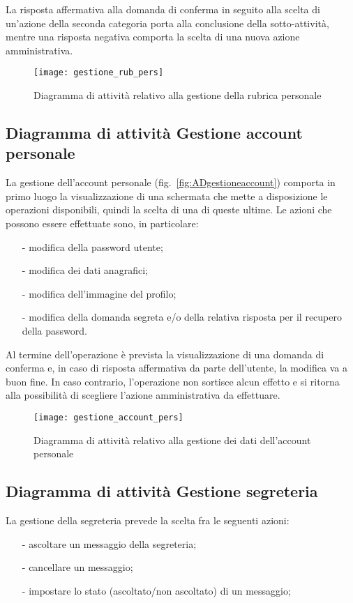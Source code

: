 La risposta affermativa alla domanda di conferma in seguito alla scelta di un'azione della seconda categoria porta alla conclusione della sotto-attività, mentre una risposta negativa comporta la scelta di una nuova azione amministrativa.

\begin{figure}[H]
\centering
\texttt{[image: gestione\_rub\_pers]}
\caption{Diagramma di attività relativo alla gestione della rubrica personale}\label{fig:ADgestionerubrica}
\end{figure}

\subsection{Diagramma di attività Gestione account personale}
La gestione dell'account personale (fig.~\vref{fig:ADgestioneaccount}) comporta in primo luogo la visualizzazione di una schermata che mette a disposizione le operazioni disponibili, quindi la scelta di una di queste ultime. Le azioni che possono essere effettuate sono, in particolare:
\begin{itemize}[noitemsep,nolistsep]
  \item[-] modifica della password utente;
  \item[-] modifica dei dati anagrafici;
  \item[-] modifica dell'immagine del profilo;
  \item[-] modifica della domanda segreta e/o della relativa risposta per il recupero della password.
\end{itemize}

Al termine dell'operazione è prevista la visualizzazione di una domanda di conferma e, in caso di risposta affermativa da parte dell'utente, la modifica va a buon fine. In caso contrario, l'operazione non sortisce alcun effetto e si ritorna alla possibilità di scegliere l'azione amministrativa da effettuare.

\begin{figure}[H]
\centering
\texttt{[image: gestione\_account\_pers]}
\caption{Diagramma di attività relativo alla gestione dei dati dell'account personale}\label{fig:ADgestioneaccount}
\end{figure}

\subsection{Diagramma di attività Gestione segreteria}
La gestione della segreteria prevede la scelta fra le seguenti azioni:
\begin{itemize}[noitemsep,nolistsep]
 \item[-] ascoltare un messaggio della segreteria;
 \item[-] cancellare un messaggio;
 \item[-] impostare lo stato (ascoltato/non ascoltato) di un messaggio;
\end{itemize}

